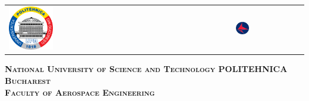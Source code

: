 



\begin{titlepage}
	\centering
	\begin{tabular}{p{6cm}p{3.3cm}}
		\includegraphics[width=0.2\textwidth]{img/upb.png} &
		\includegraphics[width=0.2\textwidth]{img/fia.png}
	\end{tabular}
	\vspace{1cm}

	{\scshape\Large \textbf{National University of Science and Technology POLITEHNICA Bucharest} \\}
	{\scshape\Large \textbf{Faculty of Aerospace Engineering} \\}
	
\end{titlepage}

